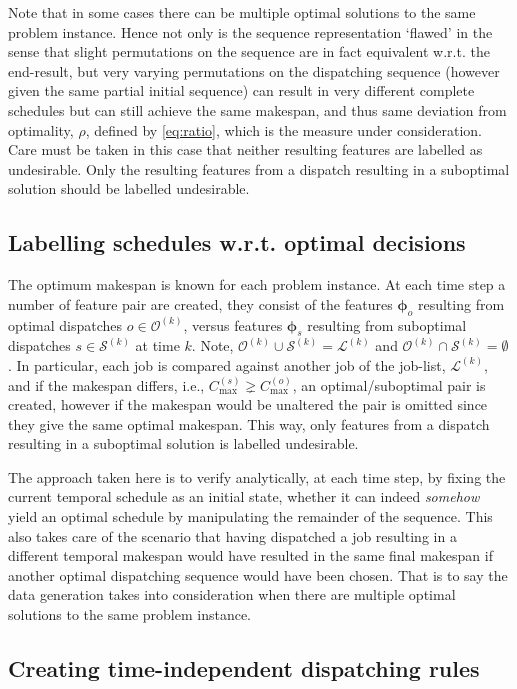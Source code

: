 \documentclass[smallextended]{svjour3}
\renewcommand{\vphi}{\bm \phi}
\begin{document}
Note that in some cases there can be multiple optimal solutions to the same 
problem instance. Hence not only is the sequence representation `flawed' in the 
sense that slight permutations on the sequence are in fact equivalent w.r.t. 
the end-result, but very varying permutations on the dispatching sequence 
(however given the same partial initial sequence) can result in very different 
complete schedules but can still achieve the same makespan, and thus same 
deviation from optimality, $\rho$, defined by \eqref{eq:ratio}, which is the 
measure under consideration. Care must be taken in this case that neither 
resulting features are labelled as undesirable. Only the resulting features 
from a dispatch resulting in a suboptimal solution should be labelled 
undesirable.

\subsection{Labelling schedules w.r.t. optimal decisions}
The optimum makespan is known for each problem instance. At each time step a 
number of feature pair are created, they consist of the features $\vphi_o$ 
resulting from optimal dispatches $o\in\mathcal{O}^{(k)}$, versus features 
$\vphi_s$ resulting from suboptimal dispatches $s\in\mathcal{S}^{(k)}$ at time 
$k$. Note, $\mathcal{O}^{(k)}\cup\mathcal{S}^{(k)}=\mathcal{L}^{(k)}$ and 
$\mathcal{O}^{(k)}\cap\mathcal{S}^{(k)}=\emptyset$.
In particular, each job is compared against another job of the job-list, 
$\mathcal{L}^{(k)}$, and if the makespan differs, i.e., $C_{\max}^{(s)}\gneq 
C_{\max}^{(o)}$, an optimal/suboptimal pair is created, however if the makespan 
would be unaltered the pair is omitted since they give the same optimal 
makespan. This way, only features from a dispatch resulting in a suboptimal 
solution is labelled undesirable.

The approach taken here is to verify analytically, at each time step, by fixing 
the current temporal schedule as an initial state, whether it can indeed 
\emph{somehow} yield an optimal schedule by manipulating the remainder of the 
sequence. This also takes care of the scenario that having dispatched a job 
resulting in a different temporal makespan would have resulted in the same 
final makespan if another optimal dispatching sequence would have been chosen. 
That is to say the data generation takes into consideration when there are 
multiple optimal solutions to the same problem instance. 

\subsection{Creating time-independent dispatching 
rules}\label{sec:ord:timeindependent}
\end{document}
